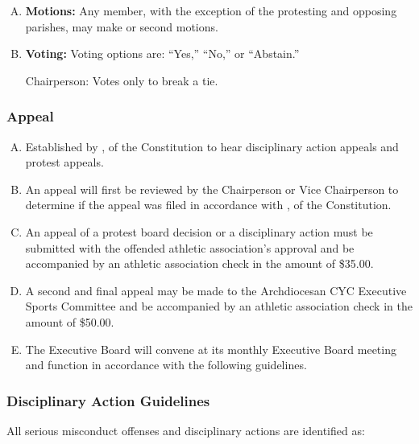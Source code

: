 \begin{enumerate}[A.]
    \item \textbf{Motions:} Any member, with the exception of the protesting and opposing parishes, may make or second motions.
    \item \textbf{Voting:} Voting options are: ``Yes,'' ``No,'' or ``Abstain.''

    Chairperson:  Votes only to break a tie.
 \end{enumerate}

\subsubsection{Appeal}
\begin{enumerate}[A.]
    \item Established by ,  of the Constitution to hear disciplinary action appeals and protest appeals.
    \item An appeal will first be reviewed by the Chairperson or Vice Chairperson to determine if the appeal was filed in accordance with ,  of the Constitution.
    \item An appeal of a protest board decision or a disciplinary action must be submitted with the offended athletic association’s approval and be accompanied by an athletic association check in the amount of \$35.00.
    \item A second and final appeal may be made to the Archdiocesan CYC Executive Sports Committee and be accompanied by an athletic association check in the amount of \$50.00.
    \item The Executive Board will convene at its monthly Executive Board meeting and function in accordance with the following guidelines.
\end{enumerate}

\subsubsection{Disciplinary Action Guidelines}
All serious misconduct offenses and disciplinary actions are identified as:

